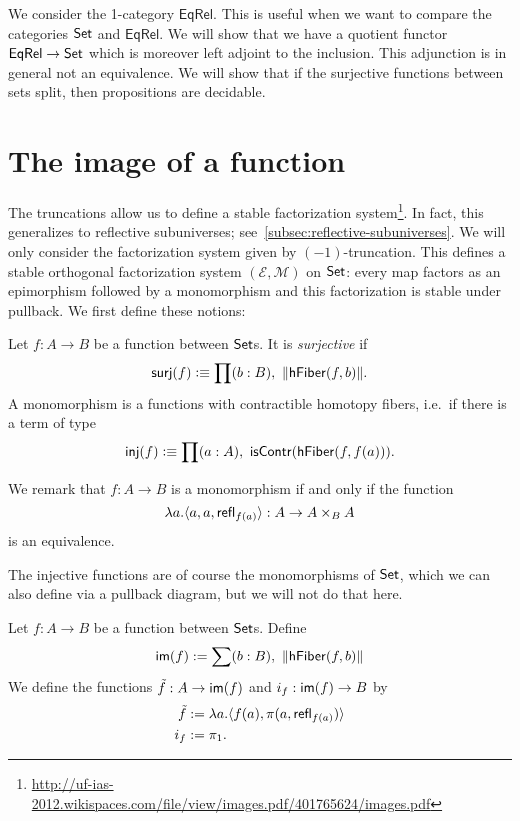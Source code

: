 We consider the 1-category $\mathsf{EqRel}$. 
This is useful when we want to compare the categories $\mathsf{Set}$ and $\mathsf{EqRel}$. We will show that we have
a quotient functor $\mathsf{EqRel}\to\mathsf{Set}$ which is moreover left
adjoint to the inclusion. This adjunction is in general not an equivalence. We will show that if the
surjective functions between sets split, then propositions are decidable.

\section{The image of a function}
The truncations allow us to define a stable factorization
system\footnote{\url{http://uf-ias-2012.wikispaces.com/file/view/images.pdf/401765624/images.pdf}}.
In fact, this generalizes to reflective subuniverses; see~\autoref{subsec:reflective-subuniverses}.
We will only consider the factorization system given by $(-1)$-truncation.
This defines a stable orthogonal factorization system $(\mathcal{E},
\mathcal{M})$ on $\mathsf{Set}$: every map factors as an epimorphism followed by a 
monomorphism and this factorization is stable under pullback.
We first define these notions:
\begin{defn}
Let $f:A\to B$ be a function between $\mathsf{Set}$s. It is \emph{surjective} if
\begin{equation*}
\mathsf{surj}(f)\defeq\prod(b:B),\ \|\hfiber{f}b\|.
\end{equation*}
A monomorphism is a functions with contractible homotopy fibers, i.e.\ if there is a term of type
\begin{equation*}
\mathsf{inj}(f)\defeq\prod(a:A),\ \mathsf{isContr}(\hfiber{f}{f(a)}).
\end{equation*}
\end{defn}

We remark that $f:A\to B$ is a monomorphism if and only if the function
\begin{equation*}
\lambda a.{\langle a,a,\mathsf{refl}_{f(a)}\rangle}:A\to A\times_B A
\end{equation*}
is an equivalence.

The injective functions are of course the monomorphisms of
$\mathsf{Set}$, which we can also define via a pullback diagram, but we will not do that here.

\begin{defn}
Let $f:A\to B$ be a function between $\mathsf{Set}$s. Define
\begin{equation*}
\im(f):=\sum(b:B),\ \|\hfiber{f}b\|
\end{equation*}
We define the functions $\tilde{f}:A\to\mathsf{im}(f)$ and $i_f:\mathsf{im}(f)\to B$ by
\begin{align*}
\tilde{f} & := \lambda a.{\langle f(a),\pi(a,\mathsf{refl}_{f(a)})\rangle}\\
i_f & := \pi_1.
\end{align*}
\end{defn}

